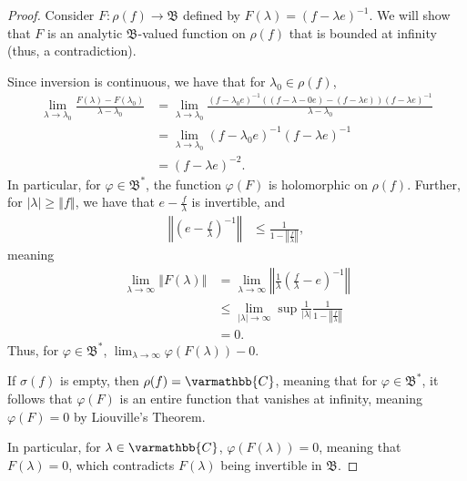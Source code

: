 \documentclass[12pt]{extarticle}
\newcommand{\C}{\mathbb{C}}
\newcommand{\norm}[1]{\left\Vert #1\right\Vert}
\theoremstyle{plain}
\theoremstyle{definition}
\theoremstyle{note}
\renewcommand*{\mathbb}[1]{\varmathbb{#1}}
\renewcommand{\newline}{\hfill\break}
\begin{document}
\begin{proof}
  Consider $F: \rho(f) \rightarrow \mathfrak{B}$ defined by $F(\lambda) = \left(f - \lambda e\right)^{-1}$. We will show that $F$ is an analytic $\mathfrak{B}$-valued function on $\rho(f)$ that is bounded at infinity (thus, a contradiction).\newline

  Since inversion is continuous, we have that for $\lambda_0 \in \rho(f)$,
  \begin{align*}
    \lim_{\lambda \rightarrow \lambda_0} \frac{F(\lambda) - F(\lambda_0)}{\lambda - \lambda_0} &= \lim_{\lambda \rightarrow \lambda_0}\frac{\left(f - \lambda_0 e\right)^{-1}\left((f - \lambda-0 e) - (f - \lambda e)\right)\left(f - \lambda e\right)^{-1}}{\lambda - \lambda_0}\\
                                                                                               &= \lim_{\lambda \rightarrow \lambda_0}\left(f - \lambda_0 e\right)^{-1}\left(f - \lambda e\right)^{-1}\\
                                 &= \left(f - \lambda e\right)^{-2}.
  \end{align*}
  In particular, for $\varphi \in \mathfrak{B}^{\ast}$, the function $\varphi(F)$ is holomorphic on $\rho(f)$. Further, for $|\lambda| \geq \norm{f}$, we have that $e - \frac{f}{\lambda}$ is invertible, and
  \begin{align*}
    \norm{\left(e - \frac{f}{\lambda}\right)^{-1}} &\leq \frac{1}{1 - \norm{\frac{f}{\lambda}}},
  \end{align*}
  meaning
  \begin{align*}
    \lim_{\lambda \rightarrow\infty}\norm{F(\lambda)} &= \lim_{\lambda \rightarrow\infty}\norm{\frac{1}{\lambda}\left(\frac{f}{\lambda} - e\right)^{-1}}\\
                                                      &\leq \lim_{|\lambda|\rightarrow\infty}\sup\frac{1}{|\lambda|} \frac{1}{1-\norm{\frac{f}{\lambda}}}\\
                                                      &= 0.
  \end{align*}
  Thus, for $\varphi \in \mathfrak{B}^{\ast}$, $\lim_{\lambda \rightarrow\infty}\varphi\left(F(\lambda)\right) - 0$.\newline

  If $\sigma(f)$ is empty, then $\rho(f) = \C$, meaning that for $\varphi \in \mathfrak{B}^{\ast}$, it follows that $\varphi(F)$ is an entire function that vanishes at infinity, meaning $\varphi(F) = 0$ by Liouville's Theorem.\newline

  In particular, for $\lambda \in \C$, $\varphi\left(F(\lambda)\right) = 0$, meaning that $F(\lambda) = 0$, which contradicts $F(\lambda)$ being invertible in $\mathfrak{B}$.
\end{proof}
\end{document}
